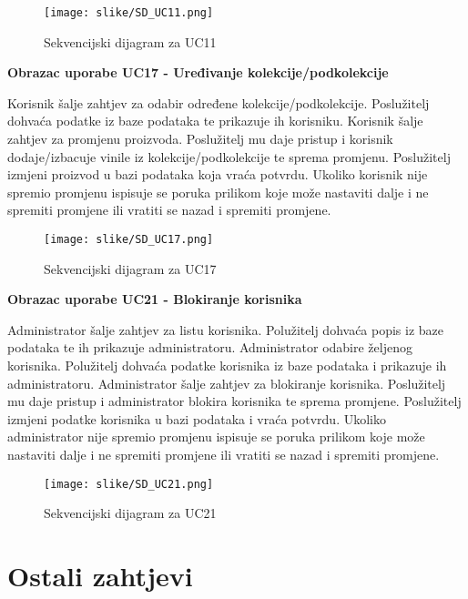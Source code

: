 				\begin{figure}[H]
					\texttt{[image: slike/SD\_UC11.png]}
					\centering
					\caption{Sekvencijski dijagram za UC11}
					\label{fig:UC11}
				\end{figure}
				
				\eject
				
			\textbf{Obrazac uporabe UC17 - Uređivanje kolekcije/podkolekcije}
				
				\text Korisnik šalje zahtjev za odabir određene kolekcije/podkolekcije. Poslužitelj dohvaća podatke iz baze podataka te prikazuje ih korisniku. Korisnik šalje zahtjev za promjenu proizvoda. Poslužitelj mu daje pristup i korisnik dodaje/izbacuje vinile iz kolekcije/podkolekcije te sprema promjenu. Poslužitelj izmjeni proizvod u bazi podataka koja vraća potvrdu.  Ukoliko korisnik nije spremio promjenu ispisuje se poruka prilikom koje može nastaviti dalje i ne spremiti promjene ili vratiti se nazad i spremiti promjene.
				
				\begin{figure}[H]
					\texttt{[image: slike/SD\_UC17.png]}
					\centering
					\caption{Sekvencijski dijagram za UC17}
					\label{fig:UC17}
				\end{figure}
				
				\eject
				
			\textbf{Obrazac uporabe UC21 - Blokiranje korisnika}
				
				\text 	Administrator šalje zahtjev za listu korisnika. Polužitelj dohvaća popis iz baze podataka te ih prikazuje administratoru. Administrator odabire željenog korisnika. Polužitelj dohvaća podatke korisnika iz baze podataka i prikazuje ih administratoru. Administrator šalje zahtjev za blokiranje korisnika. Poslužitelj mu daje pristup i administrator blokira korisnika te sprema promjene. Poslužitelj izmjeni podatke korisnika u bazi podataka i vraća potvrdu. Ukoliko administrator nije spremio promjenu ispisuje se poruka prilikom koje može nastaviti dalje i ne spremiti promjene ili vratiti se nazad i spremiti promjene.
				
				\begin{figure}[H]
					\texttt{[image: slike/SD\_UC21.png]}
					\centering
					\caption{Sekvencijski dijagram za UC21}
					\label{fig:UC21}
				\end{figure}
				
				\eject
	
		\section{Ostali zahtjevi}
		
